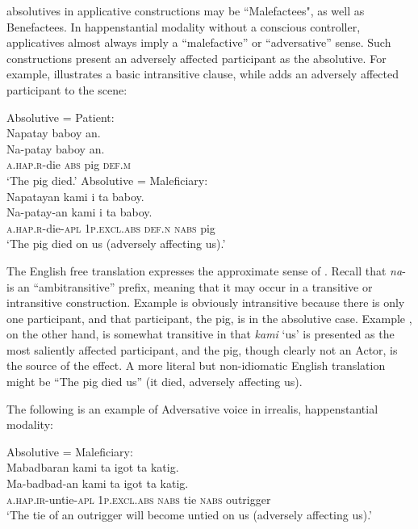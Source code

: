 absolutives in applicative constructions may be “Malefactees", as well as Benefactees. In happenstantial modality without a conscious controller, applicatives almost always imply a “malefactive” or “adversative” sense. Such constructions present an adversely affected participant as the absolutive. For example,  illustrates a basic intransitive clause, while  adds an adversely affected participant to the scene:

\ea
   \ea 
   \label{ex:thepigdied}
   Absolutive = Patient: \\
    Napatay  \emptyset{}  baboy  an. \\\smallskip
\gll Na-patay  \emptyset{}  baboy  an. \\
    \textsc{a.hap.r}-die  \textsc{abs}  pig  \textsc{def.m} \\
    \glt ‘The pig died.’
    \ex \label{ex:thepigdiedonus}Absolutive = Maleficiary: \\
    Napatayan  kami  i  ta  baboy. \\\smallskip
\gll Na-patay-an  kami  i  ta  baboy. \\
    \textsc{a.hap.r}-die-\textsc{apl}  1\textsc{p.excl.abs}  \textsc{def.n}  \textsc{nabs}  pig \\
    \glt ‘The pig died on us (adversely affecting us).’
    \z
\z

The English free translation expresses the approximate sense of . Recall that \textit{na}{}- is an “ambitransitive” prefix, meaning that it may occur in a transitive or intransitive construction. Example  is obviously intransitive because there is only one participant, and that participant, the pig, is in the absolutive case. Example , on the other hand, is somewhat transitive in that \textit{kami} ‘us’ is presented as the most saliently affected participant, and the pig, though clearly not an Actor, is the source of the effect. A more literal but non-idiomatic English translation might be “The pig died us” (it died, adversely affecting us).

The following is an example of Adversative voice in irrealis, happenstantial modality:

\ea
Absolutive = Maleficiary: \\
Mabadbaran  kami  ta  igot  ta  katig. \\\smallskip
\gll Ma-badbad-an  kami  ta  igot  ta  katig. \\
\textsc{a.hap.ir}-untie-\textsc{apl}  1\textsc{p.excl.abs}  \textsc{nabs}  tie  \textsc{nabs}  outrigger \\
\glt ‘The tie of an outrigger will become untied on us (adversely affecting us).’
\z

